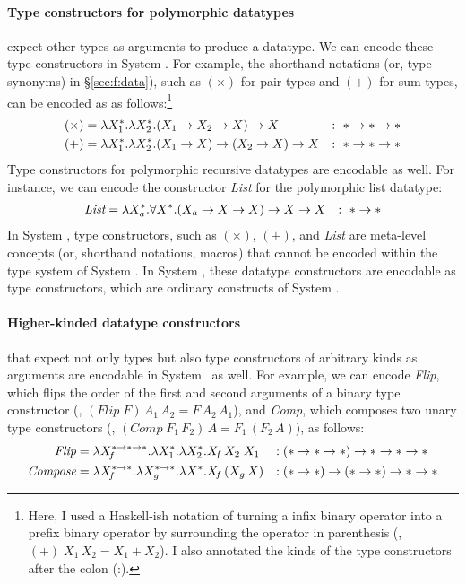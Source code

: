 \paragraph{Type constructors for polymorphic datatypes} expect
other types as arguments to produce a datatype. We can encode these 
type constructors in System \Fw. For example, the shorthand notations
(or, type synonyms) in \S\ref{sec:f:data}), such as $(\times)$ for pair types
and $(+)$ for sum types, can be encoded as as follows:\footnote{Here,
	I used a Haskell-ish notation of turning a infix binary operator
	into a prefix binary operator by surrounding the operator in parenthesis
	(\eg, $(+)\;X_1\,X_2 = X_1 + X_2$). I also annotated the kinds of
	the type constructors after the colon (:).}
\begin{align*}
(\times) &= \lambda X_1^{*}.\lambda X_2^{*}.(X_1 -> X_2 -> X) -> X &:~ * -> * -> * \\
     (+) &= \lambda X_1^{*}.\lambda X_2^{*}.(X_1 -> X) -> (X_2 -> X) -> X &:~ * -> * -> *
\end{align*}
Type constructors for polymorphic recursive datatypes are encodable as well.
For instance, we can encode the constructor \textit{List}
for the polymorphic list datatype:
\begin{align*}
	\textit{List} &= \lambda X_a^{*}.\forall X^{*}.(X_a -> X -> X) -> X -> X
	&:~ * -> *
\end{align*}
In System \F, type constructors, such as $(\times)$, $(+)$, and
\textit{List} are meta-level concepts (or, shorthand notations, macros)
that cannot be encoded within the type system of System \F.
In System \Fw, these datatype constructors are encodable as type constructors,
which are ordinary constructs of System \Fw.

\paragraph{Higher-kinded datatype constructors} that expect
not only types but also type constructors of arbitrary kinds as arguments
are encodable in System \Fw\ as well. For example, we can encode
\textit{Flip}, which flips the order of the first and second arguments of
a binary type constructor (\ie, $(\textit{Flip}\;F)\,A_1\,A_2 = F\,A_2\,A_1$),
and \textit{Comp}, which composes two unary type constructors
(\ie, $(\textit{Comp}\;F_1\,F_2)\,A = F_1\,(F_2\,A)$), as follows:
\begin{align*}
\textit{Flip} &= \lambda X_{\!f}^{*-> *-> *}.\lambda X_1^{*}.\lambda X_2^{*}.X_{\!f}\,X_2\;X_1
		     &:\;& (* -> * -> *) -> * -> * -> * \\
\textit{Compose} &= \lambda X_{\!f}^{*-> *}.\lambda X_g^{*-> *}.\lambda X^{*}.X_{\!f}\,(X_g\,X)
		     &:\;& (* -> *) -> (* -> *) -> * -> *
\end{align*}

